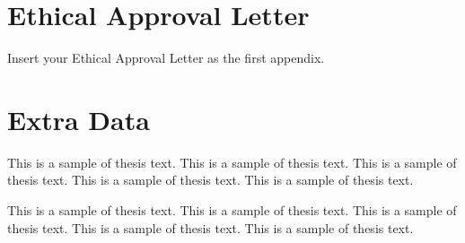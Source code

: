 \documentclass[12pt,oneside]{book} %
\begin{document}



\appendix
\chapter{Ethical Approval Letter}
Insert your Ethical Approval Letter as the first appendix.

\chapter{Extra Data}
This is a sample of thesis text. This is a sample of thesis text. This is a
sample of thesis text. This is a sample of thesis text. This is a sample of
thesis text.

This is a sample of thesis text. This is a sample of thesis text. This is a
sample of thesis text. This is a sample of thesis text. This is a sample of
thesis text.
\end{document}

